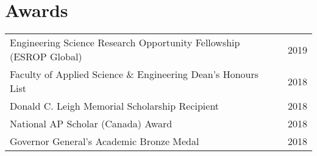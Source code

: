 \begin{minipage}[t]{0.66\textwidth}
\sectionspace %




\section{Awards}
\begin{tabular}{m{10.5cm}l}
Engineering Science Research Opportunity Fellowship (ESROP Global) & 2019\\
Faculty of Applied Science \& Engineering Dean's Honours List & 2018\textendash 2019\\
Donald C. Leigh Memorial Scholarship Recipient & 2018\\
National AP Scholar (Canada) Award & 2018\\
Governor General’s Academic Bronze Medal & 2018\\
\end{tabular}
\sectionspace %

\end{minipage} %
\vspace*{\fill}

